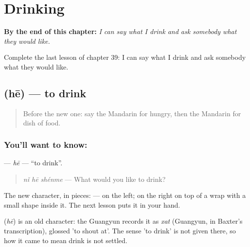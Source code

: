 
\chapter{Drinking}
\label{ch:zh-drinking}

\begin{chapteropening}
\textbf{By the end of this chapter:} \emph{I can say what I drink and ask somebody what they would like.}

Complete the last lesson of chapter 39: I can say what I drink and ask somebody what they would like.
\end{chapteropening}

\section[\texorpdfstring{\zh{喝} (hē)}{喝 (hē)}]{ (hē) — to drink}

\label{lesson:ZH-C39-he}



\begin{quote}
Before the new one: say the Mandarin for hungry, then the Mandarin for dish of food.
\end{quote}

\subsection*{You'll want to know: }
\textbf{} — \emph{hē} — \textquotedblleft{}to drink\textquotedblright{}.

\begin{quote}
\textbf{} \emph{nǐ hē shénme} — What would you like to drink?
\end{quote}

The new character, in pieces:  —  on the left; on the right  on top of a wrap with a small shape inside it. The next lesson puts it in your hand.

\begin{cousinweb}
\textbf{} (\emph{hē}) is an old character: the Guangyun records it as \emph{xat} (Guangyun, in Baxter's transcription), glossed 'to shout at'. The sense 'to drink' is not given there, so how it came to mean drink is not settled.
\end{cousinweb}

